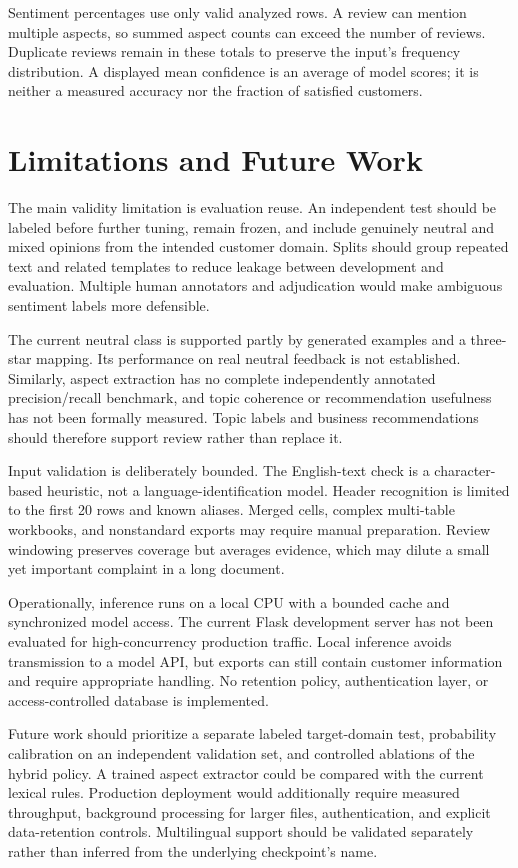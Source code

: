\documentclass[conference,a4paper]{IEEEtran}
\begin{document}
Sentiment percentages use only valid analyzed rows. A review can mention multiple aspects, so summed aspect counts can exceed the number of reviews. Duplicate reviews remain in these totals to preserve the input's frequency distribution. A displayed mean confidence is an average of model scores; it is neither a measured accuracy nor the fraction of satisfied customers.

\section{Limitations and Future Work}
The main validity limitation is evaluation reuse. An independent test should be labeled before further tuning, remain frozen, and include genuinely neutral and mixed opinions from the intended customer domain. Splits should group repeated text and related templates to reduce leakage between development and evaluation. Multiple human annotators and adjudication would make ambiguous sentiment labels more defensible.

The current neutral class is supported partly by generated examples and a three-star mapping. Its performance on real neutral feedback is not established. Similarly, aspect extraction has no complete independently annotated precision/recall benchmark, and topic coherence or recommendation usefulness has not been formally measured. Topic labels and business recommendations should therefore support review rather than replace it.

Input validation is deliberately bounded. The English-text check is a character-based heuristic, not a language-identification model. Header recognition is limited to the first 20 rows and known aliases. Merged cells, complex multi-table workbooks, and nonstandard exports may require manual preparation. Review windowing preserves coverage but averages evidence, which may dilute a small yet important complaint in a long document.

Operationally, inference runs on a local CPU with a bounded cache and synchronized model access. The current Flask development server has not been evaluated for high-concurrency production traffic. Local inference avoids transmission to a model API, but exports can still contain customer information and require appropriate handling. No retention policy, authentication layer, or access-controlled database is implemented.

Future work should prioritize a separate labeled target-domain test, probability calibration on an independent validation set, and controlled ablations of the hybrid policy. A trained aspect extractor could be compared with the current lexical rules. Production deployment would additionally require measured throughput, background processing for larger files, authentication, and explicit data-retention controls. Multilingual support should be validated separately rather than inferred from the underlying checkpoint's name.
\end{document}
